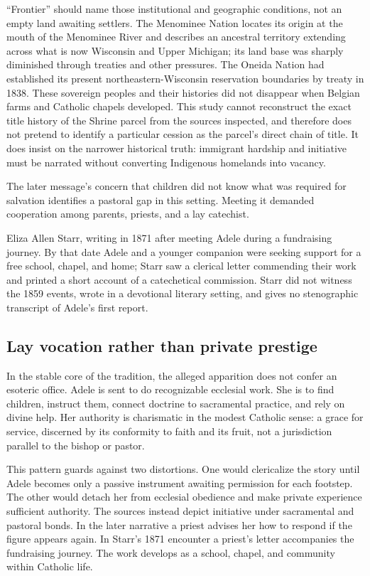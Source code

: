 “Frontier” should name those institutional and geographic conditions, not an empty land awaiting settlers. The Menominee Nation locates its origin at the mouth of the Menominee River and describes an ancestral territory extending across what is now Wisconsin and Upper Michigan; its land base was sharply diminished through treaties and other pressures. The Oneida Nation had established its present northeastern-Wisconsin reservation boundaries by treaty in 1838. These sovereign peoples and their histories did not disappear when Belgian farms and Catholic chapels developed. This study cannot reconstruct the exact title history of the Shrine parcel from the sources inspected, and therefore does not pretend to identify a particular cession as the parcel's direct chain of title. It does insist on the narrower historical truth: immigrant hardship and initiative must be narrated without converting Indigenous homelands into vacancy.

The later message's concern that children did not know what was required for salvation identifies a pastoral gap in this setting. Meeting it demanded cooperation among parents, priests, and a lay catechist.

\sourceboundary
  {Eliza Allen Starr, writing in 1871 after meeting Adele during a fundraising journey.}
  {By that date Adele and a younger companion were seeking support for a free school, chapel, and home; Starr saw a clerical letter commending their work and printed a short account of a catechetical commission.}
  {Starr did not witness the 1859 events, wrote in a devotional literary setting, and gives no stenographic transcript of Adele's first report.}

\subsection{Lay vocation rather than private prestige}

In the stable core of the tradition, the alleged apparition does not confer an esoteric office. Adele is sent to do recognizable ecclesial work. She is to find children, instruct them, connect doctrine to sacramental practice, and rely on divine help. Her authority is charismatic in the modest Catholic sense: a grace for service, discerned by its conformity to faith and its fruit, not a jurisdiction parallel to the bishop or pastor.

This pattern guards against two distortions. One would clericalize the story until Adele becomes only a passive instrument awaiting permission for each footstep. The other would detach her from ecclesial obedience and make private experience sufficient authority. The sources instead depict initiative under sacramental and pastoral bonds. In the later narrative a priest advises her how to respond if the figure appears again. In Starr's 1871 encounter a priest's letter accompanies the fundraising journey. The work develops as a school, chapel, and community within Catholic life.

